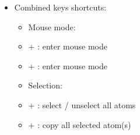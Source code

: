 {\begin{itemize}
\begin{itemize}
\begin{itemize}
\item Styles:  \\
\item[]  : change default style to   
\item[]  : change default style to 
\item[]  : change default style to  
\item[]  : change default style to  
\item[]  : change default style to 
\item[]  : change default style to  \\
\item Measures:  \\
\item[]  : show all measures for the selection, if pressed: \\
\begin{itemize}
\item once: display inter-atomic distance(s)
\item twice: display inter-atomic angles
\item a third time: hide measures \\
\end{itemize}
\item Misc: \\
\item[] \Esc : exit fullscreen mode
\item[] \Spacebar : pause / restart spinning \\
\end{itemize}
\item Combined keys shortcuts: \\
\begin{itemize}
\item Mouse mode: \\
\item[] \Alt +  : enter mouse  mode
\item[] \Alt +  : enter mouse  mode \\
\item Selection: \\
\item[] \Ctrl +  : select / unselect all atoms
\item[] \Ctrl +  : copy all selected atom(s)

\end{itemize}
\end{itemize}
\end{itemize}}
